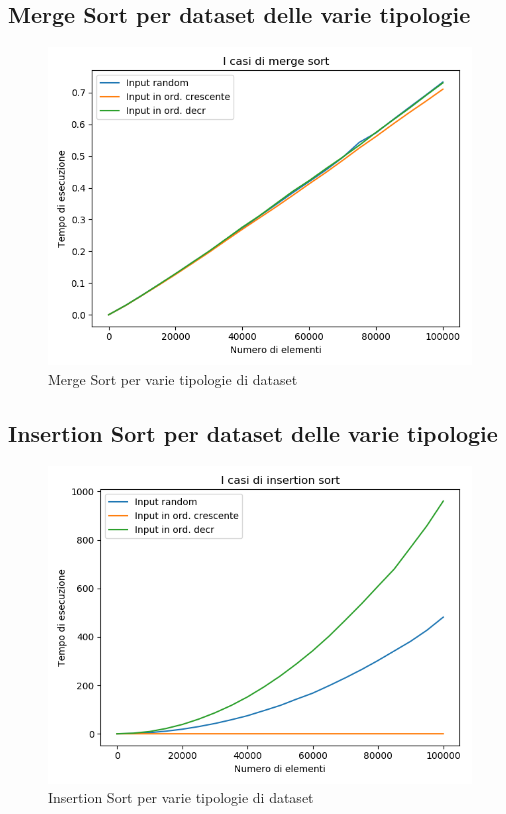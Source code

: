 \documentclass[a4paper]{article}
\begin{document}
\subsection{Merge Sort per dataset delle varie tipologie}
		\begin{figure}[!htb]
		\centering
		\includegraphics[scale=0.3]{CasiMerge}
		\caption{Merge Sort per varie tipologie di dataset}
		\label{fig:CasiMerge}
		\end{figure}
\subsection{Insertion Sort per dataset delle varie tipologie}
		\begin{figure}[!htb]
		\centering
		\includegraphics[scale=0.3]{CasiInsertion}
		\caption{Insertion Sort per varie tipologie di dataset}
		\label{fig:CasiInsertion}
		\end{figure}
\end{document}
